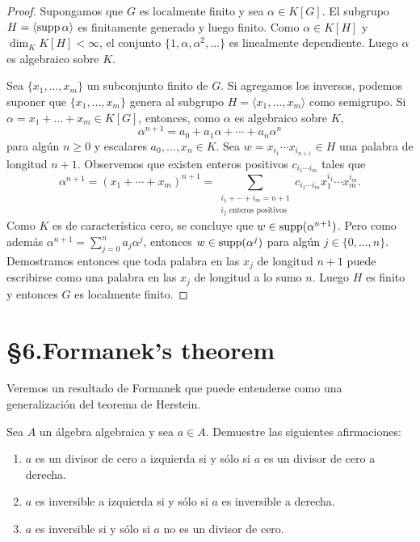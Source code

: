 \begin{proof}
	Supongamos que $G$ es localmente finito y sea $\alpha\in K[G]$. El subgrupo
	$H=\langle\operatorname{supp}\alpha\rangle$ es finitamente generado y luego finito. Como
	$\alpha\in K[H]$ y $\dim_KK[H]<\infty$, el conjunto
	$\{1,\alpha,\alpha^2,\dots\}$ es linealmente dependiente. Luego $\alpha$ es
	algebraico sobre $K$.

	Sea $\{x_1,\dots,x_m\}$ un subconjunto finito de $G$. Si agregamos los
	inversos, podemos suponer que $\{x_1,\dots,x_m\}$ genera al subgrupo
	$H=\langle x_1,\dots,x_m\rangle$ como semigrupo. Si
	$\alpha=x_1+\dots+x_m\in K[G]$, entonces, como $\alpha$ es algebraico sobre
	$K$, 
	\[
		\alpha^{n+1}=a_0+a_1\alpha+\cdots+a_n\alpha^n
	\]
	para algún $n\geq0$ y escalares $a_0,\dots,x_n\in K$. Sea $w=x_{i_1}\cdots
	x_{i_{n+1}}\in H$ una palabra de longitud $n+1$. Observemos que existen enteros
	positivos $c_{i_1\cdots i_m}$ tales que 
	\[
		\alpha^{n+1}=(x_1+\cdots+x_m)^{n+1}
		=\sum_{\substack{{i_1+\cdots+i_m=n+1}\\{\text{$i_j$ enteros positivos}}}} c_{i_1\cdots i_m}x_1^{i_1}\cdots x_{m}^{i_m}.
	\]
	Como $K$
	es de característica cero, se concluye que $w\in\operatorname{supp}(\alpha^{n+1})$.  Pero
	como además $\alpha^{n+1}=\sum_{j=0}^na_j\alpha^j$, entonces
	$w\in\operatorname{supp}(\alpha^j)$ para algún $j\in\{0,\dots,n\}$. Demostramos entonces
	que toda palabra en las $x_j$ de longitud $n+1$ puede escribirse como una
	palabra en las $x_j$ de longitud a lo sumo $n$.  Luego $H$ es finito y
	entonces $G$ es localmente finito.
\end{proof}

\section*{\S6.Formanek's theorem}

Veremos un resultado de Formanek que puede entenderse como una generalización
del teorema de Herstein. 

\begin{exercise}
	Sea $A$ un álgebra algebraica y sea $a\in A$. Demuestre las siguientes
	afirmaciones:
	\begin{enumerate}
		\item $a$ es un divisor de cero a izquierda si y sólo si $a$ es un
			divisor de cero a derecha.
		\item $a$ es inversible a izquierda si y sólo si $a$ es inversible a
			derecha.
		\item $a$ es inversible si y sólo si $a$ no es un divisor de cero.
	\end{enumerate}
\end{exercise}

